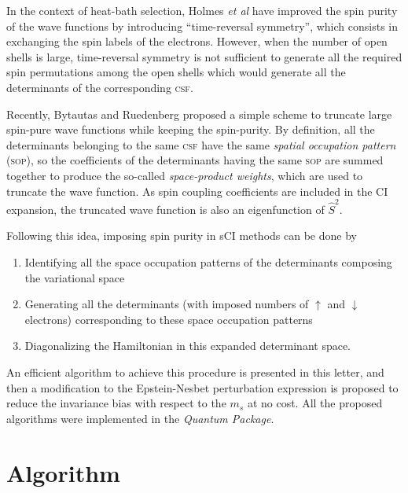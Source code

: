 \documentclass[aip,jcp,reprint,showkeys]{revtex4-1}
\newcommand{\stwo}{\hat{S}^2}
\newcommand{\up}{\uparrow}
\newcommand{\dn}{\downarrow}
\newcommand{\sop}{\textsc{sop}}
\newcommand{\csf}{\textsc{csf}}
\begin{document}
In the context of heat-bath selection, Holmes \textit{et al} have 
improved the spin purity of the wave functions by introducing ``time-reversal
symmetry''\cite{Holmes_2017}, which consists in exchanging the spin labels of
the electrons. 
However, when the number of open shells is large, time-reversal symmetry is not
sufficient to generate all the required spin permutations among the open shells
which would generate all the determinants of the corresponding \csf.

Recently, Bytautas and Ruedenberg proposed a simple scheme to truncate large
spin-pure wave functions while keeping the spin-purity.\cite{Bytautas_2007}
By definition, all the determinants belonging to the same {\csf} have the same
\emph{spatial occupation pattern} (\sop), so the
coefficients of the determinants having the same {\sop}
are summed together to produce the so-called \emph{space-product
weights}, which are used to truncate the wave function. As spin coupling
coefficients are included in the CI expansion, the truncated wave function is
also an eigenfunction of $\stwo$.

Following this idea, imposing spin purity in sCI methods can be done by 
\begin{enumerate}
\item Identifying all the space occupation patterns of the determinants composing
      the variational space
\item Generating all the determinants (with imposed numbers of $\up$ and
      $\dn$ electrons) corresponding to these space occupation patterns
\item Diagonalizing the Hamiltonian in this expanded determinant space.
\end{enumerate}
An efficient algorithm to achieve this procedure is presented in this letter,
and then a modification to the Epstein-Nesbet perturbation expression is
proposed to reduce the invariance bias with respect to the $m_s$ at no cost.
All the proposed algorithms were implemented in the
\emph{Quantum Package}.\cite{qp}


\section{Algorithm}
\end{document}
